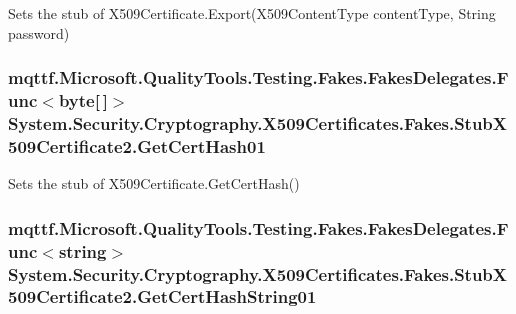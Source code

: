 Sets the stub of X509\-Certificate.\-Export(\-X509\-Content\-Type content\-Type, String password)

\hypertarget{class_system_1_1_security_1_1_cryptography_1_1_x509_certificates_1_1_fakes_1_1_stub_x509_certificate2_aa687aefaefb7c213a6ed1a20f940f44b}{
\subsubsection[{Get\-Cert\-Hash01}]{\setlength{\rightskip}{0pt plus 5cm}mqttf.\-Microsoft.\-Quality\-Tools.\-Testing.\-Fakes.\-Fakes\-Delegates.\-Func$<$byte\mbox{[}$\,$\mbox{]}$>$ System.\-Security.\-Cryptography.\-X509\-Certificates.\-Fakes.\-Stub\-X509\-Certificate2.\-Get\-Cert\-Hash01}}\label{class_system_1_1_security_1_1_cryptography_1_1_x509_certificates_1_1_fakes_1_1_stub_x509_certificate2_aa687aefaefb7c213a6ed1a20f940f44b}


Sets the stub of X509\-Certificate.\-Get\-Cert\-Hash()

\hypertarget{class_system_1_1_security_1_1_cryptography_1_1_x509_certificates_1_1_fakes_1_1_stub_x509_certificate2_a268fdfad2699908adab57c33e9bd5940}{
\subsubsection[{Get\-Cert\-Hash\-String01}]{\setlength{\rightskip}{0pt plus 5cm}mqttf.\-Microsoft.\-Quality\-Tools.\-Testing.\-Fakes.\-Fakes\-Delegates.\-Func$<$string$>$ System.\-Security.\-Cryptography.\-X509\-Certificates.\-Fakes.\-Stub\-X509\-Certificate2.\-Get\-Cert\-Hash\-String01}}\label{class_system_1_1_security_1_1_cryptography_1_1_x509_certificates_1_1_fakes_1_1_stub_x509_certificate2_a268fdfad2699908adab57c33e9bd5940}


